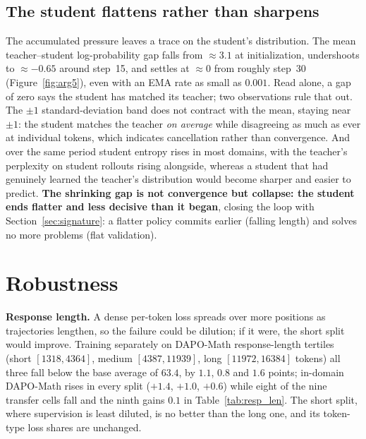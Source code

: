 \documentclass{article}
\begin{document}
\subsection{The student flattens rather than sharpens}
\label{sec:arg5}
The accumulated pressure leaves a trace on the student's distribution. The mean teacher--student log-probability gap falls from ${\approx}3.1$ at initialization, undershoots to ${\approx}-0.65$ around step~15, and settles at ${\approx}0$ from roughly step~30 (Figure~\ref{fig:arg5}), even with an EMA rate as small as $0.001$. Read alone, a gap of zero says the student has matched its teacher; two observations rule that out. The $\pm1$ standard-deviation band does not contract with the mean, staying near $\pm1$: the student matches the teacher \emph{on average} while disagreeing as much as ever at individual tokens, which indicates cancellation rather than convergence. And over the same period student entropy rises in most domains, with the teacher's perplexity on student rollouts rising alongside, whereas a student that had genuinely learned the teacher's distribution would become sharper and easier to predict. \textbf{The shrinking gap is not convergence but collapse: the student ends flatter and less decisive than it began}, closing the loop with Section~\ref{sec:signature}: a flatter policy commits earlier (falling length) and solves no more problems (flat validation).

\vspace{-5pt}
\section{Robustness}
\label{sec:further}

\textbf{Response length.}
\label{sec:lengthsplit}
A dense per-token loss spreads over more positions as trajectories lengthen, so the failure could be dilution; if it were, the short split would improve. Training separately on DAPO-Math response-length tertiles (short $[1318,4364]$, medium $[4387,11939]$, long $[11972,16384]$ tokens) all three fall below the base average of $63.4$, by $1.1$, $0.8$ and $1.6$ points; in-domain DAPO-Math rises in every split ($+1.4$, $+1.0$, $+0.6$) while eight of the nine transfer cells fall and the ninth gains $0.1$ in Table~\ref{tab:resp_len}. The short split, where supervision is least diluted, is no better than the long one, and its token-type loss shares are unchanged.
\end{document}
